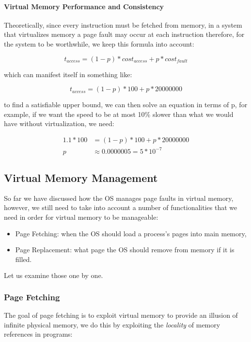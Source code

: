 \documentclass[openright, twoside]{report}
\theoremstyle{definition}
\theoremstyle{example}
\begin{document}
\paragraph{Virtual Memory Performance and Consistency}

Theoretically, since every instruction must be fetched from memory, in a system that virtualizes 
memory a page fault may occur at each instruction therefore, for the system to be worthwhile, we 
keep this formula into account:

\[
	t_{access} = (1-p)*cost_{access}+p*cost_{fault}
\]

which can manifest itself in something like:

\[
	t_{access} = (1-p)*100+p*\num{20000000}
\]

to find a satisfiable upper bound, we can then solve an equation in terms of p, for example, 
if we want the speed to be at most 10\% slower than what we would have without virtualization, 
we need:

\begin{align*}
	1.1 * 100 &= (1-p)*100+p*\num{20000000}\\ 
	p &\approx 0.0000005 = 5 * 10^{-7}
\end{align*}

\subsection{Virtual Memory Management}
So far we have discussed how the OS manages page faults in virtual memory, however, 
we still need to take into account a number of functionalities that we need in order for 
virtual memory to be manageable:

\begin{itemize}
	\item Page Fetching: when the OS should load a process's pages into main memory,
	\item Page Replacement: what page the OS should remove from memory if it is filled.
\end{itemize}

Let us examine those one by one.
\subsubsection{Page Fetching}
The goal of page fetching is to exploit virtual memory to provide an illusion of 
infinite physical memory, we do this by exploiting the \emph{locality} of memory references 
in programs:\\
\end{document}
